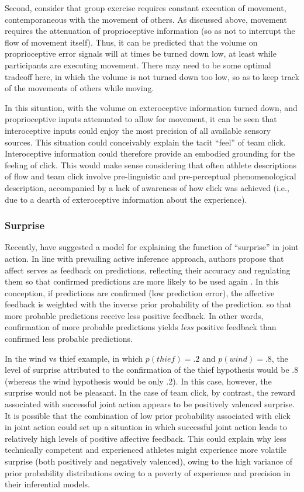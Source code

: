 \begin{CJK}{UTF8}{gbsn}
Second, consider that group exercise requires constant execution of movement, contemporaneous with the movement of others. As discussed above, movement requires the attenuation of proprioceptive information (so as not to interrupt the flow of movement itself).  Thus, it can be predicted that the volume on proprioceptive error signals will at times be turned down low, at least while participants are executing movement.  There may need to be some optimal tradeoff here, in which the volume is not turned down too low, so as to keep track of the movements of others while moving.

In this situation, with the volume on exteroceptive information turned down, and proprioceptive inputs attenuated to allow for movement, it can be seen that interoceptive inputs could enjoy the most precision of all available sensory sources. This situation could conceivably explain the tacit ``feel'' of team click.  Interoceptive information could therefore provide an embodied grounding for the feeling of click.  This would make sense considering that often athlete descriptions of flow and team click involve pre-linguistic and pre-perceptual phenomenological description, accompanied by a lack of awareness of how click was achieved (i.e., due to a dearth of exteroceptive information about the experience).

\subsubsection{Surprise}
Recently, \textcite{Chetverikov2016} have suggested a model for explaining the function of ``surprise'' in joint action.  In line with prevailing active inference approach, authors propose that affect serves as feedback on predictions, reflecting their accuracy and regulating them so that confirmed predictions are more likely to be used again \citep{Chetverikov2014}. In this conception, if predictions are confirmed (low prediction error), the affective feedback is weighted with the inverse prior probability of the prediction.
 so that more probable predictions receive less positive feedback. In other words, confirmation of more probable predictions yields \textit{less} positive feedback than confirmed less probable predictions.

In the wind vs thief example, in which $p(thief) = .2$ and $p(wind) = .8$, the level of surprise attributed to the confirmation of the thief hypothesis would be .8 (whereas the wind hypothesis would be only .2).  In this case, however, the surprise would not be pleasant. In the case of team click, by contrast, the reward associated with successful joint action appears to be positively valenced surprise.  It is possible that the combination of low prior probability associated with click in joint action could set up a situation in which successful joint action leads to relatively high levels of positive affective feedback.  This could explain why less technically competent and experienced athletes might experience more volatile surprise (both positively and negatively valenced), owing to the high variance of prior probability distributions owing to a poverty of experience and precision in their inferential models.


\end{CJK}
